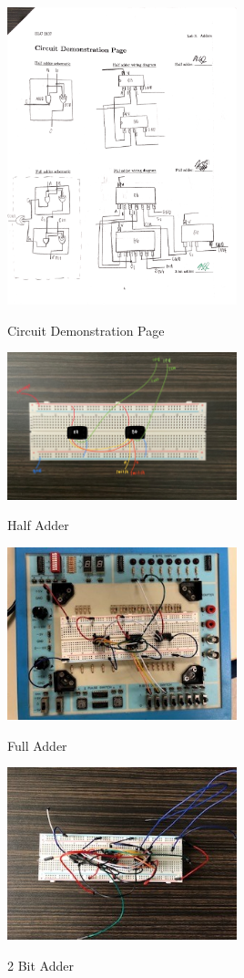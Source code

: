 \documentclass[11pt]{article}
\begin{document}
\begin{center}
	
	\includegraphics[width=0.5\textwidth]{circuit demo page}
	
	\caption{Circuit Demonstration Page}
	
	\includegraphics[width=0.5\textwidth]{half adder}
	
	\caption{Half Adder}
	
	\includegraphics[width=0.5\textwidth]{full adder}
	
	\caption{Full Adder}
	
	\includegraphics[width=0.5\textwidth]{2 bit adder}
	
	\caption{2 Bit Adder}
	
\end{center}
\end{document}
